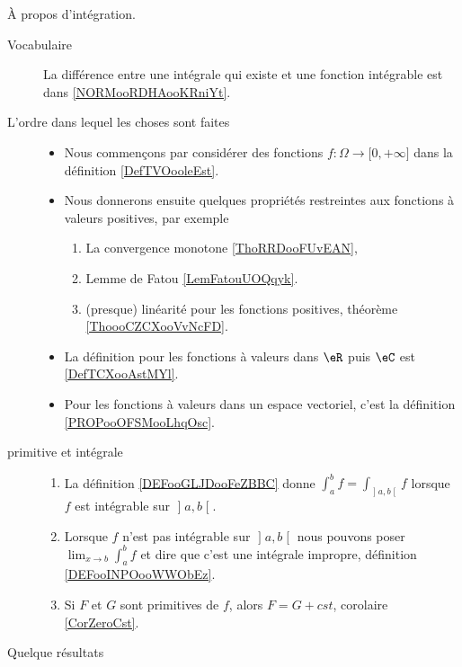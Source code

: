      \label{THEMEooHINHooJaSYQW}

À propos d'intégration.
\begin{description}
	\item[Vocabulaire] La différence entre une intégrale qui existe et une fonction intégrable est dans \ref{NORMooRDHAooKRniYt}.
	\item[L'ordre dans lequel les choses sont faites]
		\begin{itemize}
			\item
			      Nous commençons par considérer des fonctions \( f\colon \Omega\to \mathopen[ 0 , +\infty \mathclose]\) dans la définition \ref{DefTVOooleEst}.
			\item
			      Nous donnerons ensuite quelques propriétés restreintes aux fonctions à valeurs positives, par exemple
			      \begin{enumerate}
				      \item
				            La convergence monotone \ref{ThoRRDooFUvEAN},
				      \item
				            Lemme de Fatou \ref{LemFatouUOQqyk}.
				      \item
				            (presque) linéarité pour les fonctions positives, théorème \ref{ThoooCZCXooVvNcFD}.
			      \end{enumerate}
			\item
			      La définition pour les fonctions à valeurs dans \( \eR\) puis \( \eC\) est \ref{DefTCXooAstMYl}.
			\item
			      Pour les fonctions à valeurs dans un espace vectoriel, c'est la définition \ref{PROPooOFSMooLhqOsc}.
		\end{itemize}
	\item[primitive et intégrale]
		\begin{enumerate}
			\item
			      La définition \ref{DEFooGLJDooFeZBBC} donne \( \int_a^bf=\int_{\mathopen] a ,b \mathclose[}f\) lorsque \( f\) est intégrable sur \( \mathopen] a , b \mathclose[\).
			\item Lorsque \( f\) n'est pas intégrable sur \( \mathopen] a , b \mathclose[\) nous pouvons poser \( \lim_{x\to b} \int_a^bf\) et dire que c'est une intégrale impropre, définition \ref{DEFooINPOooWWObEz}.
			\item
			      Si \( F\) et \( G\) sont primitives de \( f\), alors \( F=G+cst\), corolaire \ref{CorZeroCst}.
		\end{enumerate}
	\item[Quelque résultats]

\end{description}
